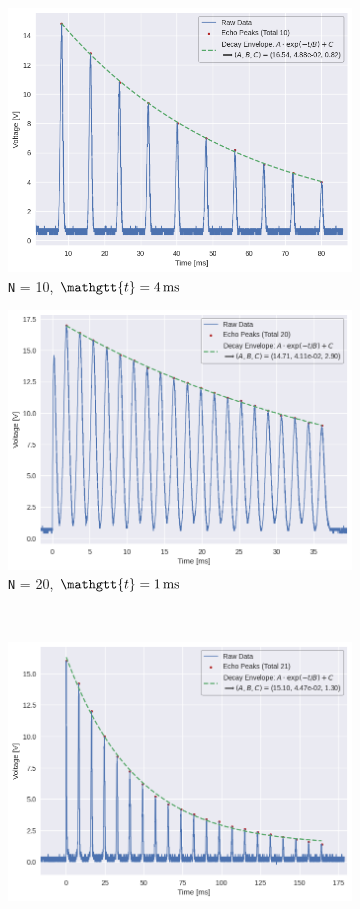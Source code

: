 \documentclass[%
 reprint,
 amsmath,amssymb,
 aps,
]{revtex4-2}
\newcommand{\taucode}{\mathgtt{t}}
\begin{document}
\begin{figure}[hbpt]
    \centering
    \begin{subfigure}{0.4\linewidth}
        \includegraphics[width = 0.8\linewidth]{figs/purcell/data2.png}
        \caption{\texttt{N} = 10, $\taucode = \SI{4}{\milli\second}$}
    \end{subfigure}
    \begin{subfigure}{0.4\linewidth}
        \includegraphics[width = 0.8\linewidth]{figs/purcell/data3.png}
        \caption{\texttt{N} = 20, $\taucode = \SI{1}{\milli\second}$}
    \end{subfigure}\\
    \begin{subfigure}{0.4\linewidth}
        \includegraphics[width = 0.8\linewidth]{figs/purcell/data1.png}

\end{subfigure}
\end{figure}
\end{document}
